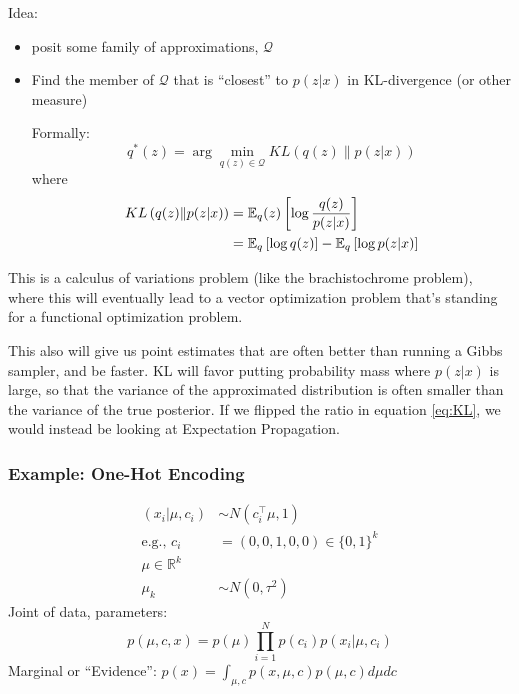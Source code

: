 \documentclass{article}
\newcommand{\E}{ \ensuremath{ \mathbb{E} }}
\begin{document}
Idea:
\begin{itemize}
  \item posit some family of approximations, $\mathcal{Q}$
  \item Find the member of $\mathcal{Q}$ that is ``closest'' to $p(z|x)$ in KL-divergence (or other measure)

  \hspace{5ex} Formally:
  \begin{equation}
    q^*(z)=\arg\min_{q(z)\in\mathcal{Q}}KL \left(q(z) \middle\| p(z|x)\right)
  \end{equation}
  where
  \begin{align}
    \label{eq:KL}
    KL \left(q(z) \middle\| p(z|x)\right) &= \E_q(z)\left[\log\frac{q(z)}{p(z|x)}\right]
    \\
    &= \E_q\left[\log q(z)\right] - \E_q\left[\log p(z|x)\right] \notag
  \end{align}
\end{itemize}

This is a calculus of variations problem (like the brachistochrome problem), where this will eventually
lead to a vector optimization problem that's standing for a functional optimization problem.

This also will give us point estimates that are often better than running a Gibbs sampler, and be faster.
KL will favor putting probability mass where $p(z|x)$ is large, so that the variance of the approximated
distribution is often smaller than the variance of the true posterior. If we flipped the ratio in equation
\ref{eq:KL}, we would instead be looking at Expectation Propagation.

\subsubsection{Example: One-Hot Encoding}
\begin{align*}
  (x_i|\mu, c_i) &\sim N(c_i^\top \mu, 1)
  \\
  \textrm{e.g.,~}c_i &= (0, 0, 1, 0, 0) \in \{0,1\}^k
  \\
  \mu\in\mathbb{R}^k
  \\
  \mu_k&\sim N(0,\tau^2)
\end{align*}
Joint of data, parameters:
\begin{equation*}
  p(\mu,c,x)=p(\mu)\prod_{i=1}^N p(c_i)p(x_i|\mu,c_i)
\end{equation*}
Marginal or ``Evidence'': $p(x)=\int_{\mu,c}p(x,\mu,c)p(\mu,c)d\mu dc$
\end{document}
